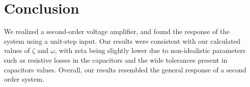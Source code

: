 \section{Conclusion}\label{sec:conclusion}
We realized a second-order voltage amplifier, and found the response of the system using a unit-step input. Our results were consistent with our calculated values of $\zeta$ and $\omega$, with zeta being slightly lower due to non-idealistic parameters such as resistive losses in the capacitors and the wide tolerances present in capacitors values. Overall, our results resembled the general response of a second order system.
